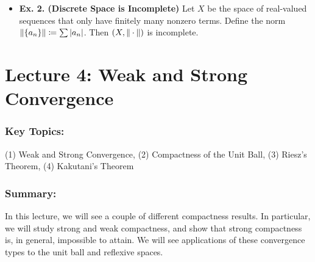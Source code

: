 \documentclass{article}
\def\xmax{1}\def\ymax{1.2}
\begin{document}
\begin{itemize}
\begin{figure}[h!]
		\caption{Approximation of a non-smooth function by smooth functions. Note that the red function should be supported in $[0,1]$.}
		\label{fig:cinfty_not_complete}
	\end{figure}
	\item \textbf{Ex. 2. (Discrete Space is Incomplete)} Let $X$ be the space of real-valued sequences that only have finitely many nonzero terms. Define the norm $\left\Vert \{a_{n}\} \right\Vert \coloneqq \sum \left| a_{n} \right|$. Then $(X, \left\Vert \hspace{2pt}\cdot\hspace{2pt} \right\Vert)$ is incomplete. 
\end{itemize}

\section{Lecture 4: Weak and Strong Convergence}
\subsubsection{Key Topics:}
(1) Weak and Strong Convergence, (2) Compactness of the Unit Ball, (3) Riesz's Theorem, (4) Kakutani's Theorem 
\subsubsection{Summary:}
In this lecture, we will see a couple of different compactness results. In particular, we will study strong and weak compactness, and show that strong compactness is, in general, impossible to attain. We will see applications of these convergence types to the unit ball and reflexive spaces. 
\end{document}
